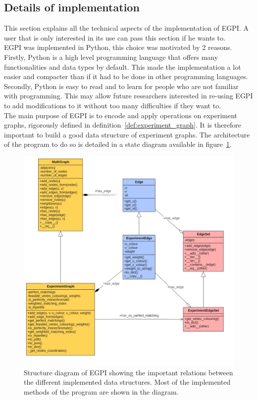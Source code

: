 \subsection{Details of implementation}
\label{subsec:details-of-implementation}

This section explains all the technical aspects of the implementation of EGPI. A user that is only interested in its use can pass this section if he wants to.\\

EGPI was implemented in Python, this choice was motivated by 2 reasons.
Firstly, Python is a high level programming language that offers many functionalities and data types by default.\cite{python} This made the implementation a lot easier and compacter than if it had to be done in other programming languages.
Secondly, Python is easy to read and to learn for people who are not familiar with programming.
This may allow future researchers interested in re-using EGPI to add modifications to it without too many difficulties if they want to.\\

The main purpose of EGPI is to encode and apply operations on experiment graphs, rigorously defined in definition~\ref{def:experiment_graph}.
It is therefore important to build a good data structure of experiment graphs.
The architecture of the program to do so is detailed in a state diagram available in figure~\ref{fig:structure_diagram}.

\begin{figure}[H]
    \centering
    \includegraphics[scale=0.25]{figures/new_results/egpi/structure_diagram}
    \caption{Structure diagram of EGPI showing the important relations between the different implemented data structures. Most of the implemented methods of the program are shown in the diagram.}
    \label{fig:structure_diagram}
\end{figure}

